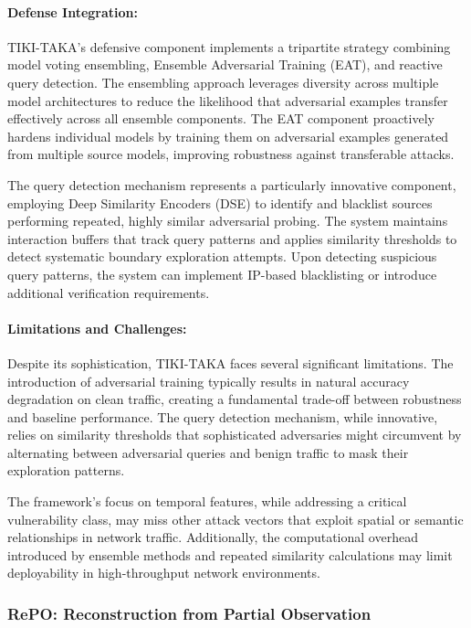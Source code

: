 \paragraph{Defense Integration:}
TIKI-TAKA's defensive component implements a tripartite strategy combining model voting ensembling, Ensemble Adversarial Training (EAT), and reactive query detection. The ensembling approach leverages diversity across multiple model architectures to reduce the likelihood that adversarial examples transfer effectively across all ensemble components. The EAT component proactively hardens individual models by training them on adversarial examples generated from multiple source models, improving robustness against transferable attacks.

The query detection mechanism represents a particularly innovative component, employing Deep Similarity Encoders (DSE) to identify and blacklist sources performing repeated, highly similar adversarial probing. The system maintains interaction buffers that track query patterns and applies similarity thresholds to detect systematic boundary exploration attempts. Upon detecting suspicious query patterns, the system can implement IP-based blacklisting or introduce additional verification requirements.

\paragraph{Limitations and Challenges:}
Despite its sophistication, TIKI-TAKA faces several significant limitations. The introduction of adversarial training typically results in natural accuracy degradation on clean traffic, creating a fundamental trade-off between robustness and baseline performance. The query detection mechanism, while innovative, relies on similarity thresholds that sophisticated adversaries might circumvent by alternating between adversarial queries and benign traffic to mask their exploration patterns.

The framework's focus on temporal features, while addressing a critical vulnerability class, may miss other attack vectors that exploit spatial or semantic relationships in network traffic. Additionally, the computational overhead introduced by ensemble methods and repeated similarity calculations may limit deployability in high-throughput network environments.

\subsubsection{RePO: Reconstruction from Partial Observation}

